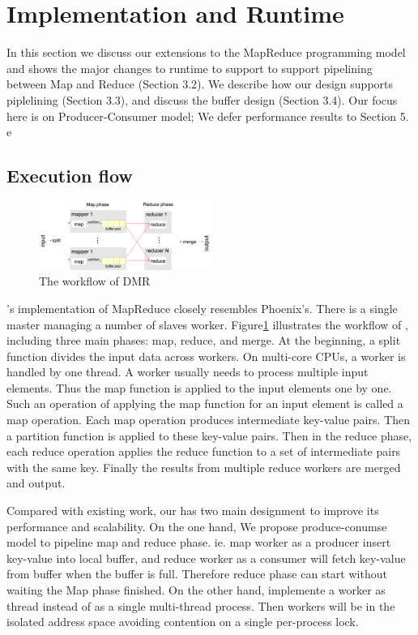 \section{Implementation and Runtime}
In this section we discuss our extensions to 
the MapReduce programming model and shows the major changes to runtime to 
support \myds
to support pipelining between Map and Reduce (Section 3.2). 
We describe how our design supports
piplelining (Section 3.3), and discuss the buffer design (Section 3.4). 
Our focus here is on Producer-Consumer model; 
We defer performance results to Section 5.
e


\subsection{Execution flow}
\begin{figure}[!h!t]  
    \centering
    \includegraphics[width=0.5\textwidth]{eps/dmr_workflow.eps}
    \caption{The workflow of DMR}
    \label{fig:dmr:workflow}
\end{figure}

\myds's implementation of MapReduce closely resembles Phoenix’s. 
There is a single master managing a number of slaves worker. 
Figure\ref{fig:dmr:workflow} illustrates the workflow of \myds,
including three main phases: map, reduce, and merge. 
At the beginning, a split function divides the input
data across workers. 
On multi-core CPUs, a worker is handled by one thread. 
A worker usually needs to process multiple input elements. 
Thus the map function is applied to the input elements one by one. 
Such an operation of applying the map function for an input element is 
called a map operation. 
Each map operation produces intermediate key-value pairs. 
Then a partition function is applied to these key-value pairs. 
Then in the reduce phase, each reduce operation
applies the reduce function to a set of intermediate pairs
with the same key. 
Finally the results from multiple reduce workers are merged and output.

Compared with existing work, 
our \myds has two main designment to improve its performance and scalability.
On the one hand, We propose produce-conumse model to 
pipeline map and reduce phase. 
ie. map worker as a producer insert key-value into local buffer,
and reduce worker as a consumer will fetch key-value from buffer
when the buffer is full. 
Therefore reduce phase can start without waiting the Map phase finished.
On the other hand, \myds implemente a worker as \myth thread 
instead of as a single multi-thread process.
Then workers will be in the isolated address space 
avoiding contention on a single per-process lock.

